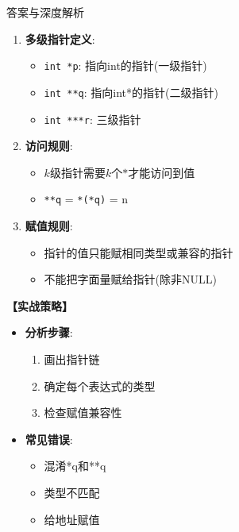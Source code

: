 \documentclass[a4paper,12pt]{article}
\begin{document}
\begin{bluebox}{答案与深度解析}
	\begin{enumerate}[leftmargin=*, nosep]
		\item \textbf{多级指针定义}:
		      \begin{itemize}
			      \item \texttt{int *p}: 指向int的指针(一级指针)
			      \item \texttt{int **q}: 指向int*的指针(二级指针)
			      \item \texttt{int ***r}: 三级指针
		      \end{itemize}

		\item \textbf{访问规则}:
		      \begin{itemize}
			      \item \(k\)级指针需要\(k\)个\(*\)才能访问到值
			      \item \texttt{**q} = \texttt{*(*q)} = n
		      \end{itemize}

		\item \textbf{赋值规则}:
		      \begin{itemize}
			      \item 指针的值只能赋相同类型或兼容的指针
			      \item 不能把字面量赋给指针(除非NULL)
		      \end{itemize}
	\end{enumerate}

	\textbf{【实战策略】}
	\begin{itemize}[leftmargin=*, nosep]
		\item \textbf{分析步骤}:
		      \begin{enumerate}
			      \item 画出指针链
			      \item 确定每个表达式的类型
			      \item 检查赋值兼容性
		      \end{enumerate}

		\item \textbf{常见错误}:
		      \begin{itemize}
			      \item 混淆*q和**q
			      \item 类型不匹配
			      \item 给地址赋值
		      \end{itemize}
	\end{itemize}
\end{bluebox}
\end{document}
